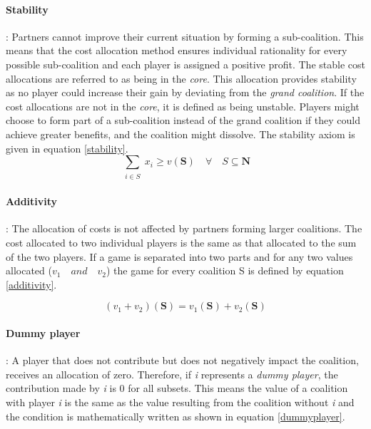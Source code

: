 \paragraph{Stability}: Partners cannot improve their current situation by forming a sub-coalition. This means that the cost allocation method ensures individual rationality for every possible sub-coalition and each player is assigned a positive profit. The stable cost allocations are referred to as being in the \textit{core}. This allocation provides stability as no player could increase their gain by deviating from the \textit{grand coalition}. If the cost allocations are not in the \textit{core}, it is defined as being unstable. Players might choose to form part of a sub-coalition instead of the grand coalition if they could achieve greater benefits, and the coalition might dissolve. The stability axiom is given in equation \ref{stability}.
\begin{equation}
\label{stability}
\sum_{\substack{i\in S}} x_\textit{i} \geq v (\textbf{S}) \quad \forall \quad S \subseteq \textbf{N}
\end{equation}

\paragraph{Additivity}: The allocation of costs is not affected by partners forming larger coalitions. The cost allocated to two individual players is the same as that allocated to the sum of the two players. If a game is separated into two parts and for any two values allocated (\(v_1\quad and \quad v_2\)) the game for every coalition S is defined by equation \ref{additivity}.

\begin{equation}
\label{additivity}
    ( v_1 + v_2 )(\textbf{S}) = v_1(\textbf{S}) + v_2(\textbf{S}) 
\end{equation}

\paragraph{Dummy player}: A player that does not contribute but does not negatively impact the coalition, receives an allocation of zero. Therefore, if \textit{i} represents a \textit{dummy player}, the contribution made by \textit{i} is 0 for all subsets. This means the value of a coalition with player \textit{i} is the same as the value resulting from the coalition without \textit{i} and the condition is mathematically written as shown in equation \ref{dummyplayer}.


